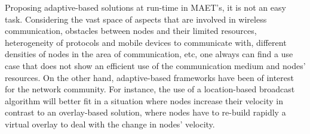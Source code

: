 {	Proposing adaptive-based solutions at run-time in MAET's, it is not an easy task. 
	Considering the vast space of aspects that are involved in wireless communication, obstacles between nodes and their limited resources, heterogeneity of protocols and mobile devices to communicate with, different densities of nodes in the area of communication, etc, one always can find a use case that does not show an efficient use of the communication medium and nodes' resources. 
	On the other hand, adaptive-based frameworks have been of interest for the network community. 
	For instance, the use of a location-based broadcast algorithm will better fit in a situation where nodes increase their velocity in contrast to an overlay-based solution, where nodes have to re-build rapidly a virtual overlay to deal with the change in nodes' velocity. 
}

